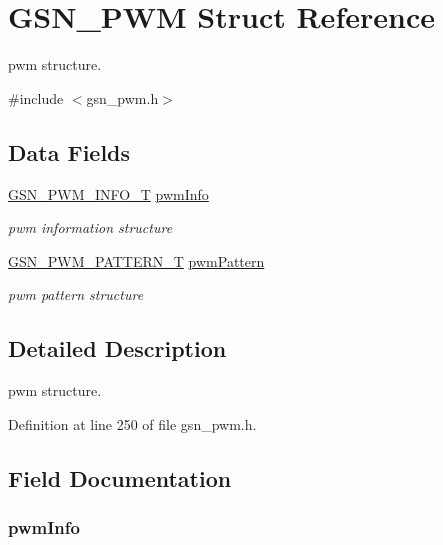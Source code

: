 \hypertarget{a00180}{
\section{GSN\_\-PWM Struct Reference}
\label{a00180}
}


pwm structure.  




{\ttfamily \#include $<$gsn\_\-pwm.h$>$}

\subsection*{Data Fields}
\begin{DoxyCompactItemize}
\item 
\hyperlink{a00454}{GSN\_\-PWM\_\-INFO\_\-T} \hyperlink{a00180_aba5ca32ca6c4d93d12190d543c1f4f13}{pwmInfo}
\begin{DoxyCompactList}\small\item\em pwm information structure \end{DoxyCompactList}\item 
\hyperlink{a00183}{GSN\_\-PWM\_\-PATTERN\_\-T} \hyperlink{a00180_ac81f6e8f23a85b246aaa7e15f6fc7fdf}{pwmPattern}
\begin{DoxyCompactList}\small\item\em pwm pattern structure \end{DoxyCompactList}\end{DoxyCompactItemize}


\subsection{Detailed Description}
pwm structure. 

Definition at line 250 of file gsn\_\-pwm.h.



\subsection{Field Documentation}
\hypertarget{a00180_aba5ca32ca6c4d93d12190d543c1f4f13}{
\subsubsection[{pwmInfo}]{ {\bf pwmInfo}}}
\label{a00180_aba5ca32ca6c4d93d12190d543c1f4f13}



